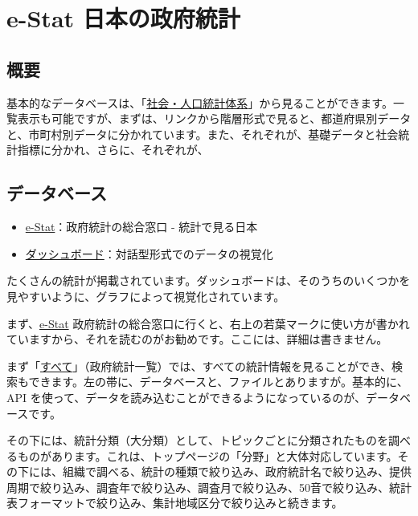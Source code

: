 \documentclass[
  xelatex, ja=standard]{bxjsbook}
\providecommand{\tightlist}{%
  \setlength{\itemsep}{0pt}\setlength{\parskip}{0pt}}
\theoremstyle{definition}
\theoremstyle{definition}
\theoremstyle{definition}
\theoremstyle{definition}
\theoremstyle{remark}
\begin{document}
\hypertarget{estat-site}{%
\chapter{e-Stat 日本の政府統計}\label{estat-site}}

\hypertarget{ux6982ux8981-6}{%
\section{概要}\label{ux6982ux8981-6}}

基本的なデータベースは、「\href{https://www.e-stat.go.jp/stat-search/database?page=1\&layout=normal\&toukei=00200502}{社会・人口統計体系}」から見ることができます。一覧表示も可能ですが、まずは、リンクから階層形式で見ると、都道府県別データと、市町村別データに分かれています。また、それぞれが、基礎データと社会統計指標に分かれ、さらに、それぞれが、

\hypertarget{ux30c7ux30fcux30bfux30d9ux30fcux30b9-4}{%
\section{データベース}\label{ux30c7ux30fcux30bfux30d9ux30fcux30b9-4}}

\begin{itemize}
\tightlist
\item
  \href{https://www.e-stat.go.jp/}{e-Stat}：政府統計の総合窓口 - 統計で見る日本
\item
  \href{https://dashboard.e-stat.go.jp}{ダッシュボード}：対話型形式でのデータの視覚化
\end{itemize}

たくさんの統計が掲載されています。ダッシュボードは、そのうちのいくつかを見やすいように、グラフによって視覚化されています。

まず、\href{https://www.e-stat.go.jp/}{e-Stat} 政府統計の総合窓口に行くと、右上の若葉マークに使い方が書かれていますから、それを読むのがお勧めです。ここには、詳細は書きません。

まず「\href{https://www.e-stat.go.jp/stat-search?page=1}{すべて}」（政府統計一覧）では、すべての統計情報を見ることができ、検索もできます。左の帯に、データベースと、ファイルとありますが。基本的に、API を使って、データを読み込むことができるようになっているのが、データベースです。

その下には、統計分類（大分類）として、トピックごとに分類されたものを調べるものがあります。これは、トップページの「分野」と大体対応しています。その下には、組織で調べる、統計の種類で絞り込み、政府統計名で絞り込み、提供周期で絞り込み、調査年で絞り込み、調査月で絞り込み、50音で絞り込み、統計表フォーマットで絞り込み、集計地域区分で絞り込みと続きます。
\end{document}
